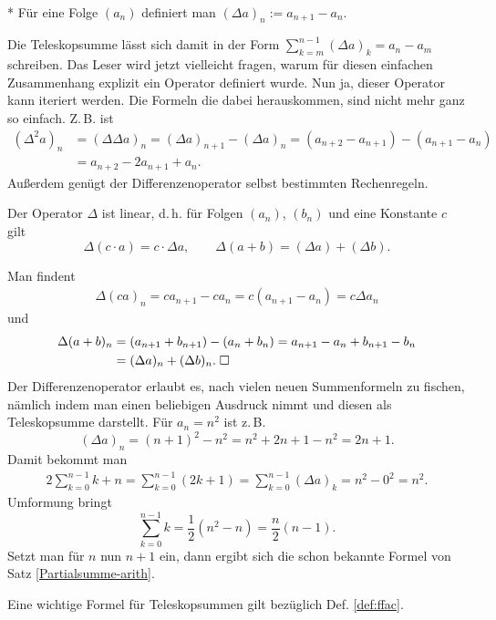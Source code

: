 \begin{Definition}[Differenzenoperator]\mbox{}\\*
Für eine Folge $(a_n)$ definiert man
$(\Delta a)_n := a_{n+1}-a_n.$
\end{Definition}
Die Teleskopsumme lässt sich damit in der Form
$\sum_{k=m}^{n-1}(\Delta a)_k = a_n-a_m$
schreiben. Das Leser wird jetzt vielleicht fragen, warum für diesen
einfachen Zusammenhang explizit ein Operator definiert wurde.
Nun ja, dieser Operator kann iteriert werden. Die Formeln die
dabei herauskommen, sind nicht mehr ganz so einfach. Z.\,B. ist
\begin{align*}
(\Delta^2 a)_n &= (\Delta \Delta a)_n
= (\Delta a)_{n+1}-(\Delta a)_n
= (a_{n+2}-a_{n+1}) - (a_{n+1}-a_n)\\
&= a_{n+2}-2a_{n+1}+a_n.
\end{align*}
Außerdem genügt der Differenzenoperator selbst bestimmten Rechenregeln.
\begin{Satz}
Der Operator $\Delta$ ist linear, d.\,h. für
Folgen $(a_n)$, $(b_n)$ und eine Konstante $c$ gilt%
\[\Delta(c\cdot a) = c\cdot\Delta a,\qquad
\Delta(a+b) = (\Delta a)+(\Delta b).\]
\end{Satz}
 Man findent
\begin{gather*}
\Delta (ca)_n = ca_{n+1}-ca_n
= c(a_{n+1}-a_n) = c\Delta a_n
\end{gather*}
und
\begin{align*}
\Delta (a+b)_n &= (a_{n+1}+b_{n+1})-(a_n+b_n)
= a_{n+1}-a_n + b_{n+1}-b_n\\
&= (\Delta a)_n + (\Delta b)_n.\;\Box
\end{align*}
Der Differenzenoperator erlaubt es, nach vielen neuen Summenformeln
zu fischen, nämlich indem man einen beliebigen Ausdruck nimmt und
diesen als Teleskopsumme darstellt. Für $a_n=n^2$ ist z.\,B.
\[(\Delta a)_n = (n+1)^2-n^2 = n^2+2n+1-n^2 = 2n+1.\]
Damit bekommt man
\begin{gather*}
2\sum_{k=0}^{n-1} k + n = \sum_{k=0}^{n-1} (2k+1) = 
\sum_{k=0}^{n-1} (\Delta a)_k
= n^2-0^2 = n^2.
\end{gather*}
Umformung bringt
\[\sum_{k=0}^{n-1} k = \frac{1}{2}(n^2-n) = \frac{n}{2}(n-1).\]
Setzt man für $n$ nun $n+1$ ein, dann ergibt sich die schon
bekannte Formel von Satz \ref{Partialsumme-arith}.

Eine wichtige Formel für Teleskopsummen gilt
bezüglich Def. \ref{def:ffac}.

